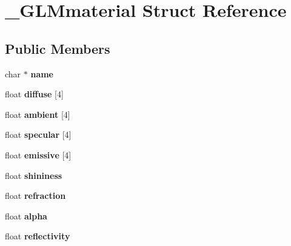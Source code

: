 \hypertarget{struct___g_l_mmaterial}{}\section{\+\_\+\+G\+L\+Mmaterial Struct Reference}
\label{struct___g_l_mmaterial}
\subsection*{Public Members}
\begin{DoxyCompactItemize}
\item 
\mbox{\label{struct___g_l_mmaterial_a5aabee911354d036897d176132348601}} 
char $\ast$ {\bfseries name}
\item 
\mbox{\label{struct___g_l_mmaterial_ae681a1190f483b2d3c453310d71e6695}} 
float {\bfseries diffuse} \mbox{[}4\mbox{]}
\item 
\mbox{\label{struct___g_l_mmaterial_a21746af865024774319096ee58e6f1a8}} 
float {\bfseries ambient} \mbox{[}4\mbox{]}
\item 
\mbox{\label{struct___g_l_mmaterial_aba1a37c9fb803b1f3ed9242731231984}} 
float {\bfseries specular} \mbox{[}4\mbox{]}
\item 
\mbox{\label{struct___g_l_mmaterial_af262dae00f2a455aa5f1c4857e56b846}} 
float {\bfseries emissive} \mbox{[}4\mbox{]}
\item 
\mbox{\label{struct___g_l_mmaterial_a112fcbb496020aaea91759214390881b}} 
float {\bfseries shininess}
\item 
\mbox{\label{struct___g_l_mmaterial_a406501e4b51c8758948e7dc16856ddf7}} 
float {\bfseries refraction}
\item 
\mbox{\label{struct___g_l_mmaterial_ac9009e0fd9cc6caf76effee04bdc7abb}} 
float {\bfseries alpha}
\item 
\mbox{\label{struct___g_l_mmaterial_ac2db5371f121570d5e7d29ca505155e0}} 
float {\bfseries reflectivity}

\end{DoxyCompactItemize}
